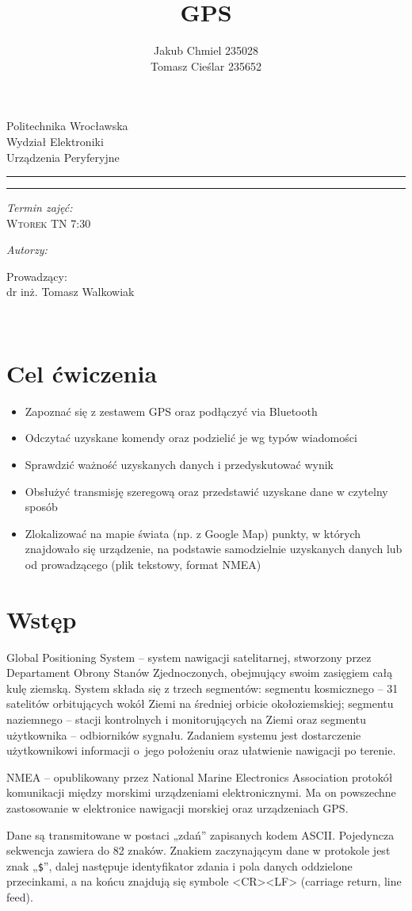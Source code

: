 \documentclass[12pt,a4paper,notitlepage]{report}
\author{ Jakub Chmiel  235028 \\ Tomasz Cieślar 235652}
\title{GPS}
\makeatletter
\newcommand{\linia}{\rule{\linewidth}{0.4mm}}
\renewcommand{\maketitle}{\begin{titlepage}
    \vspace*{1cm}
    \begin{center}\small
    Politechnika Wrocławska\\
    Wydział Elektroniki\\
    Urządzenia Peryferyjne 
    \end{center}
    \vspace{4.5cm}
    \noindent\linia
    \begin{center}
      \LARGE \textsc{\@title}
         \end{center}
     \linia
    \vspace{0.5cm}
    \begin{flushright}
    \begin{minipage}{6cm}
    
     \vspace{3cm}
     \textit{\small Termin zajęć:}\\
     \normalsize \textsc{Wtorek TN 7:30} \par
	\vspace{0.3cm}    
    \textit{\small Autorzy:}\\
    \normalsize \textsc{\@author} \par
     \vspace{0.3cm}
        Prowadzący: \\ dr inż. Tomasz Walkowiak

    \end{minipage}
    \vspace{1cm}
     {\small }\\
       
     \end{flushright}
    \vspace*{\stretch{3}}
    \begin{center}
    \@date
    \end{center}
  \end{titlepage}%
}
\makeatother
\begin{document}
\maketitle

\newpage
\tableofcontents
\newpage
\renewcommand*\thesection{\arabic{section}}
\section{Cel ćwiczenia}
\begin{itemize}
\item Zapoznać się z zestawem GPS oraz podłączyć via Bluetooth
\item Odczytać uzyskane komendy oraz podzielić je wg typów wiadomości
\item Sprawdzić ważność uzyskanych danych i przedyskutować wynik
\item Obsłużyć transmisję szeregową oraz przedstawić uzyskane dane w czytelny sposób
\item Zlokalizować na mapie świata (np. z Google Map) punkty, w których znajdowało się urządzenie, na podstawie samodzielnie uzyskanych danych lub od prowadzącego (plik tekstowy, format NMEA)

\end{itemize}

\section{Wstęp}
Global Positioning System  – system nawigacji satelitarnej, stworzony przez Departament Obrony Stanów Zjednoczonych, obejmujący swoim zasięgiem całą kulę ziemską. System składa się z trzech segmentów: segmentu kosmicznego – 31 satelitów orbitujących wokół Ziemi na średniej orbicie okołoziemskiej; segmentu naziemnego – stacji kontrolnych i monitorujących na Ziemi oraz segmentu użytkownika – odbiorników sygnału. Zadaniem systemu jest dostarczenie użytkownikowi informacji o~jego położeniu oraz ułatwienie nawigacji po terenie.

NMEA – opublikowany przez National Marine Electronics Association protokół komunikacji między morskimi urządzeniami elektronicznymi. Ma on powszechne zastosowanie w elektronice nawigacji morskiej oraz urządzeniach GPS.

Dane są transmitowane w postaci „zdań” zapisanych kodem ASCII. Pojedyncza sekwencja zawiera do 82 znaków. Znakiem zaczynającym dane w protokole jest znak „\texttt{\$}”, dalej następuje identyfikator zdania i pola danych oddzielone przecinkami, a na końcu znajdują się symbole <CR><LF> (carriage return, line feed).
\end{document}
